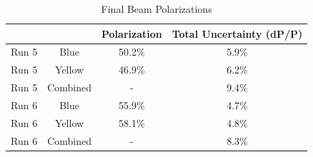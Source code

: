 \begin{table}
  \centering
  \begin{tabular}{cc|cc}
    \hline
     & & Polarization & Total Uncertainty (dP/P)\\
    \hline
    Run 5 &  Blue & 50.2\% & 5.9\%\\
    Run 5 &  Yellow  & 46.9\% & 6.2\%\\
    Run 5 &  Combined & - & 9.4\%\\
    \hline
    Run 6 &  Blue & 55.9\% & 4.7\%\\
    Run 6 &  Yellow & 58.1\% & 4.8\%\\
    Run 6 &  Combined & - &  8.3\%\\
    \hline
  \end{tabular}
  \caption{Final Beam Polarizations}
  \label{tab:polarizations}
\end{table}
